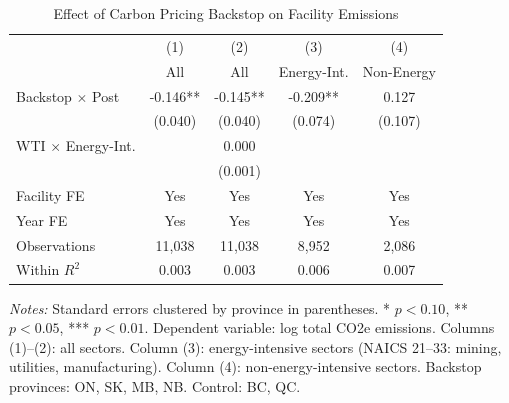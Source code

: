 \begin{table}[htbp]
\centering
\caption{Effect of Carbon Pricing Backstop on Facility Emissions}
\label{tab:main}
\begin{tabular}{l cccc}
\hline\hline
 & (1) & (2) & (3) & (4) \\
 & All & All & Energy-Int. & Non-Energy \\
\hline
Backstop $\times$ Post & -0.146** & -0.145** & -0.209** & 0.127 \\
 & (0.040) & (0.040) & (0.074) & (0.107) \\[6pt]
WTI $\times$ Energy-Int. & & 0.000 & & \\
 & & (0.001) & & \\[6pt]
\hline
Facility FE & Yes & Yes & Yes & Yes \\
Year FE & Yes & Yes & Yes & Yes \\
Observations & 11,038 & 11,038 & 8,952 & 2,086 \\
Within $R^2$ & 0.003 & 0.003 & 0.006 & 0.007 \\
\hline\hline
\end{tabular}
\begin{minipage}{0.95\textwidth}
\footnotesize
\textit{Notes:} Standard errors clustered by province in parentheses. * $p<0.10$, ** $p<0.05$, *** $p<0.01$. Dependent variable: log total CO2e emissions. Columns (1)--(2): all sectors. Column (3): energy-intensive sectors (NAICS 21--33: mining, utilities, manufacturing). Column (4): non-energy-intensive sectors. Backstop provinces: ON, SK, MB, NB. Control: BC, QC.
\end{minipage}
\end{table}
